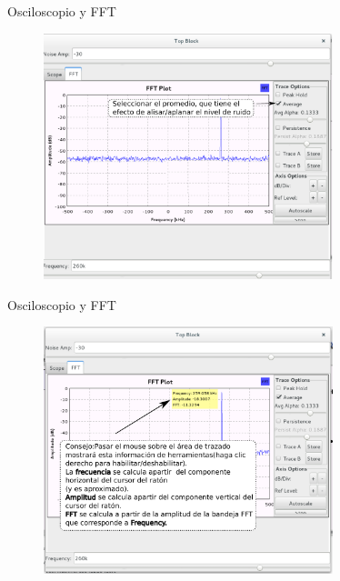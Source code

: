 \begin{frame}{Osciloscopio y FFT}
\begin{figure}[H]
\vspace{-3mm}
\centering
\includegraphics[width=0.75\textwidth]{lab2/pdf/lab2_11.pdf}
\end{figure}
\end{frame}

\begin{frame}{Osciloscopio y FFT}
\begin{figure}[H]
\vspace{-3mm}
\centering
\includegraphics[width=0.75\textwidth]{lab2/pdf/lab2_12.pdf}
\end{figure}
\end{frame}

